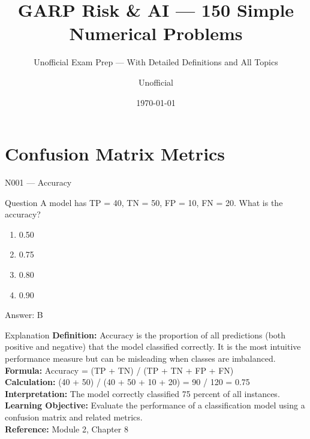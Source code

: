 \documentclass[aspectratio=169,8pt]{beamer}
\title[GARP RAI]{GARP Risk \& AI --- 150 Simple Numerical Problems}
\subtitle{Unofficial Exam Prep --- With Detailed Definitions and All Topics}
\author{Unofficial}
\date{\today}
\begin{document}
	
	\begin{frame}
		\titlepage
	\end{frame}
	
	\section{Confusion Matrix Metrics}
	
	\begin{frame}{N001 --- Accuracy}
		\begin{block}{Question}
			A model has TP = 40, TN = 50, FP = 10, FN = 20. What is the accuracy?
			\begin{enumerate}
				\item 0.50
				\item 0.75
				\item 0.80
				\item 0.90
			\end{enumerate}
		\end{block}
		\begin{exampleblock}{Answer: B}\end{exampleblock}
		\begin{block}{Explanation}
			\textbf{Definition:} Accuracy is the proportion of all predictions (both positive and negative) that the model classified correctly. It is the most intuitive performance measure but can be misleading when classes are imbalanced.\\
			\textbf{Formula:} Accuracy = (TP + TN) / (TP + TN + FP + FN)\\
			\textbf{Calculation:} (40 + 50) / (40 + 50 + 10 + 20) = 90 / 120 = 0.75\\
			\textbf{Interpretation:} The model correctly classified 75 percent of all instances.\\
			\textbf{Learning Objective:} Evaluate the performance of a classification model using a confusion matrix and related metrics.\\
			\textbf{Reference:} Module 2, Chapter 8
		\end{block}
	\end{frame}
	
\end{document}
